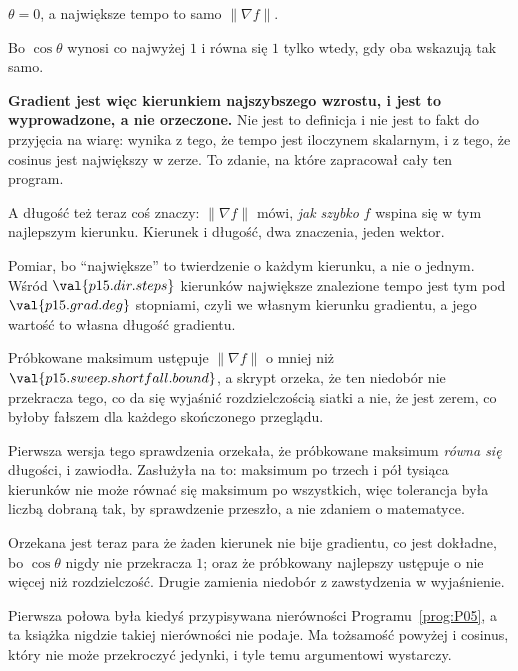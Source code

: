 \begin{fr}
\begin{ansblock}
$\theta = 0$, a największe tempo to samo $\lVert \nabla f \rVert$.
\end{ansblock}

Bo $\cos\theta$ wynosi co najwyżej $1$ i równa się $1$ tylko wtedy, gdy oba
wskazują tak samo.

\textbf{Gradient jest więc kierunkiem najszybszego wzrostu, i jest to
wyprowadzone, a nie orzeczone.} Nie jest to definicja i nie jest to fakt do
przyjęcia na wiarę: wynika z tego, że tempo jest iloczynem skalarnym, i z
tego, że cosinus jest największy w zerze. To zdanie, na które zapracował cały
ten program.

A długość też teraz coś znaczy: $\lVert \nabla f \rVert$ mówi, \emph{jak
szybko} $f$ wspina się w tym najlepszym kierunku. Kierunek i długość, dwa
znaczenia, jeden wektor.
\end{fr}

\begin{fr}
Pomiar, bo \enquote{największe} to twierdzenie o każdym kierunku, a nie o
jednym. Wśród $\val{p15.dir.steps}$ kierunków największe znalezione tempo jest
tym pod $\val{p15.grad.deg}$ stopniami, czyli we własnym kierunku gradientu, a
jego wartość to własna długość gradientu.

Próbkowane maksimum ustępuje $\lVert \nabla f \rVert$ o mniej niż
$\val{p15.sweep.shortfall.bound}$, a skrypt orzeka, że ten niedobór nie
przekracza tego, co da się wyjaśnić rozdzielczością siatki \dash{} a nie, że
jest zerem, co byłoby fałszem dla każdego skończonego przeglądu.

\begin{note}
Pierwsza wersja tego sprawdzenia orzekała, że próbkowane maksimum
\emph{równa się} długości, i zawiodła. Zasłużyła na to: maksimum po trzech i
pół tysiąca kierunków nie może równać się maksimum po wszystkich, więc
tolerancja była liczbą dobraną tak, by sprawdzenie przeszło, a nie zdaniem o
matematyce.

Orzekana jest teraz para \dash{} że żaden kierunek nie bije gradientu, co jest
dokładne, bo $\cos\theta$ nigdy nie przekracza $1$; oraz że próbkowany
najlepszy ustępuje o nie więcej niż rozdzielczość. Drugie zamienia niedobór z
zawstydzenia w wyjaśnienie.

Pierwsza połowa była kiedyś przypisywana nierówności
Programu~\ref{prog:P05}, a ta książka nigdzie takiej nierówności nie podaje.
Ma tożsamość powyżej i cosinus, który nie może przekroczyć jedynki, i tyle
temu argumentowi wystarczy.
\end{note}
\end{fr}

